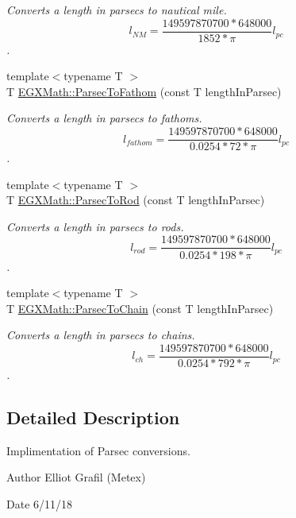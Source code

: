 \begin{DoxyCompactItemize}
\begin{DoxyCompactList}\small\item\em Converts a length in parsecs to nautical mile. \[ l_{NM}= \frac{149597870700 * 648000}{1852 * \pi} l_{pc} \]. \end{DoxyCompactList}\item 
{\footnotesize template$<$typename T $>$ }\\T \mbox{\hyperlink{group___e_g_x_math-_conversions-_length_conversions-_astronomical-_parsec-_nautical_gab621169a5b3794b8405b4b0bca2b6092}{E\+G\+X\+Math\+::\+Parsec\+To\+Fathom}} (const T length\+In\+Parsec)
\begin{DoxyCompactList}\small\item\em Converts a length in parsecs to fathoms. \[ l_{fathom}= \frac{149597870700 * 648000}{0.0254 * 72 * \pi} l_{pc} \]. \end{DoxyCompactList}\item 
{\footnotesize template$<$typename T $>$ }\\T \mbox{\hyperlink{group___e_g_x_math-_conversions-_length_conversions-_astronomical-_parsec-_surveyors_gae1b8ed339937e1c769e4617dbe1e70e1}{E\+G\+X\+Math\+::\+Parsec\+To\+Rod}} (const T length\+In\+Parsec)
\begin{DoxyCompactList}\small\item\em Converts a length in parsecs to rods. \[ l_{rod}= \frac{149597870700 * 648000}{0.0254 * 198 * \pi} l_{pc} \]. \end{DoxyCompactList}\item 
{\footnotesize template$<$typename T $>$ }\\T \mbox{\hyperlink{group___e_g_x_math-_conversions-_length_conversions-_astronomical-_parsec-_surveyors_gafe4318e1971a50fd899558ca0e9cf7c6}{E\+G\+X\+Math\+::\+Parsec\+To\+Chain}} (const T length\+In\+Parsec)
\begin{DoxyCompactList}\small\item\em Converts a length in parsecs to chains. \[ l_{ch}= \frac{149597870700 * 648000}{0.0254 * 792 * \pi} l_{pc} \]. \end{DoxyCompactList}\end{DoxyCompactItemize}


\subsection{Detailed Description}
Implimentation of Parsec conversions. 

\begin{DoxyAuthor}{Author}
Elliot Grafil (Metex) 
\end{DoxyAuthor}
\begin{DoxyDate}{Date}
6/11/18 
\end{DoxyDate}
